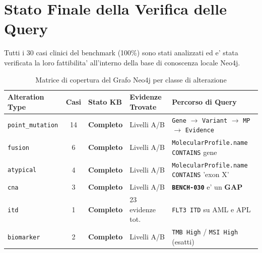 \documentclass[12pt, a4paper]{article}
\newcommand{\pass}[1]{{\color{passgreen}\textbf{#1}}}
\newcommand{\fail}[1]{{\color{failred}\textbf{#1}}}
\newcommand{\bench}[1]{{\texttt{\textbf{#1}}}}
\begin{document}
\section{Stato Finale della Verifica delle Query}

Tutti i 30 casi clinici del benchmark (100\%) sono stati analizzati ed e' stata verificata la loro fattibilita' all'interno della base di conoscenza locale Neo4j.

\begin{table}[ht]
\centering\renewcommand{\arraystretch}{1.35}
\caption{Matrice di copertura del Grafo Neo4j per classe di alterazione}
\begin{tabular}{lcp{2.8cm}p{3cm}p{4.8cm}}
\toprule
\rowcolor{primaryblue}
\color{white}\textbf{Alteration Type} & \color{white}\textbf{Casi} & \color{white}\textbf{Stato KB} & \color{white}\textbf{Evidenze Trovate} & \color{white}\textbf{Percorso di Query} \\
\midrule
\texttt{point\_mutation} & 14 & \pass{Completo} & Livelli A/B & \texttt{Gene} $\to$ \texttt{Variant} $\to$ \texttt{MP} $\to$ \texttt{Evidence} \\
\rowcolor{roweven}
\texttt{fusion} & 6 & \pass{Completo} & Livelli A/B & \texttt{MolecularProfile.name} \texttt{CONTAINS} gene \\
\texttt{atypical} & 4 & \pass{Completo} & Livelli A/B & \texttt{MolecularProfile.name} \texttt{CONTAINS} 'exon X' \\
\rowcolor{roweven}
\texttt{cna} & 3 & \pass{Completo} & Livelli A/B & \bench{BENCH-030} e' un \fail{GAP} \\
\texttt{itd} & 1 & \pass{Completo} & 23 evidenze tot. & \texttt{FLT3 ITD} su AML e APL \\
\rowcolor{roweven}
\texttt{biomarker} & 2 & \pass{Completo} & Livelli A/B & \texttt{TMB High} / \texttt{MSI High} (esatti) \\
\bottomrule
\end{tabular}
\end{table}
\end{document}
